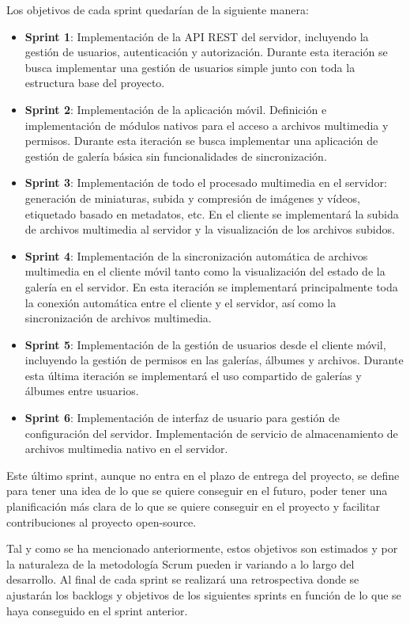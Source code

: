 Los objetivos de cada sprint quedarían de la siguiente manera:
\begin{itemize}
    \item \textbf{Sprint 1}: Implementación de la API REST del servidor, incluyendo la gestión de usuarios, autenticación y autorización. Durante esta iteración se busca implementar una gestión de usuarios simple junto con toda la estructura base del proyecto.
    \item \textbf{Sprint 2}: Implementación de la aplicación móvil. Definición e implementación de módulos nativos para el acceso a archivos multimedia y permisos. Durante esta iteración se busca implementar una aplicación de gestión de galería básica sin funcionalidades de sincronización.
    \item \textbf{Sprint 3}: Implementación de todo el procesado multimedia en el servidor: generación de miniaturas, subida y compresión de imágenes y vídeos, etiquetado basado en metadatos, etc. En el cliente se implementará la subida de archivos multimedia al servidor y la visualización de los archivos subidos.
    \item \textbf{Sprint 4}: Implementación de la sincronización automática de archivos multimedia en el cliente móvil tanto como la visualización del estado de la galería en el servidor. En esta iteración se implementará principalmente toda la conexión automática entre el cliente y el servidor, así como la sincronización de archivos multimedia.
    \item \textbf{Sprint 5}: Implementación de la gestión de usuarios desde el cliente móvil, incluyendo la gestión de permisos en las galerías, álbumes y archivos. Durante esta última iteración se implementará el uso compartido de galerías y álbumes entre usuarios.
    \item \textbf{Sprint 6}: Implementación de interfaz de usuario para gestión de configuración del servidor. Implementación de servicio de almacenamiento de archivos multimedia nativo en el servidor.
\end{itemize}
Este último sprint, aunque no entra en el plazo de entrega del proyecto, se define para tener una idea de lo que se quiere conseguir en el futuro, poder tener una planificación más clara de lo que se quiere conseguir en el proyecto y facilitar contribuciones al proyecto open-source.

Tal y como se ha mencionado anteriormente, estos objetivos son estimados y por la naturaleza de la metodología Scrum pueden ir variando a lo largo del desarrollo. Al final de cada sprint se realizará una retrospectiva donde se ajustarán los backlogs y objetivos de los siguientes sprints en función de lo que se haya conseguido en el sprint anterior.

